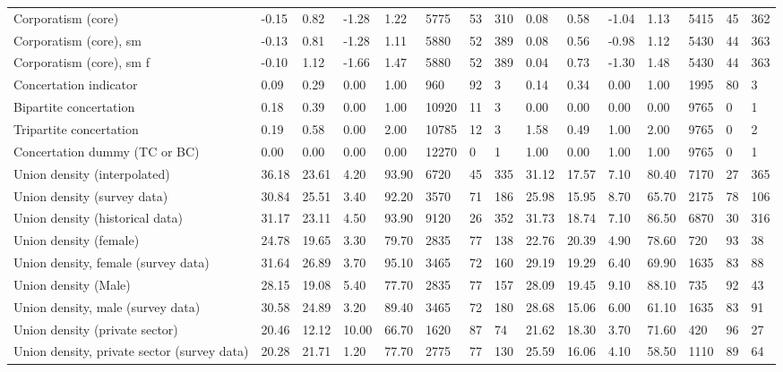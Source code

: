 \begin{longtable}{lllllllllllllll}
Corporatism (core) & -0.15 & 0.82 & -1.28 & 1.22 & 5775 & 53 & 310 & 0.08 & 0.58 & -1.04 & 1.13 & 5415 & 45 & 362\\
\addlinespace
Corporatism (core), sm & -0.13 & 0.81 & -1.28 & 1.11 & 5880 & 52 & 389 & 0.08 & 0.56 & -0.98 & 1.12 & 5430 & 44 & 363\\
Corporatism (core), sm f & -0.10 & 1.12 & -1.66 & 1.47 & 5880 & 52 & 389 & 0.04 & 0.73 & -1.30 & 1.48 & 5430 & 44 & 363\\
Concertation indicator & 0.09 & 0.29 & 0.00 & 1.00 & 960 & 92 & 3 & 0.14 & 0.34 & 0.00 & 1.00 & 1995 & 80 & 3\\
Bipartite concertation & 0.18 & 0.39 & 0.00 & 1.00 & 10920 & 11 & 3 & 0.00 & 0.00 & 0.00 & 0.00 & 9765 & 0 & 1\\
Tripartite concertation & 0.19 & 0.58 & 0.00 & 2.00 & 10785 & 12 & 3 & 1.58 & 0.49 & 1.00 & 2.00 & 9765 & 0 & 2\\
\addlinespace
Concertation dummy (TC or BC) & 0.00 & 0.00 & 0.00 & 0.00 & 12270 & 0 & 1 & 1.00 & 0.00 & 1.00 & 1.00 & 9765 & 0 & 1\\
Union density (interpolated) & 36.18 & 23.61 & 4.20 & 93.90 & 6720 & 45 & 335 & 31.12 & 17.57 & 7.10 & 80.40 & 7170 & 27 & 365\\
Union density (survey data) & 30.84 & 25.51 & 3.40 & 92.20 & 3570 & 71 & 186 & 25.98 & 15.95 & 8.70 & 65.70 & 2175 & 78 & 106\\
Union density (historical data) & 31.17 & 23.11 & 4.50 & 93.90 & 9120 & 26 & 352 & 31.73 & 18.74 & 7.10 & 86.50 & 6870 & 30 & 316\\
Union density (female) & 24.78 & 19.65 & 3.30 & 79.70 & 2835 & 77 & 138 & 22.76 & 20.39 & 4.90 & 78.60 & 720 & 93 & 38\\
\addlinespace
Union density, female (survey data) & 31.64 & 26.89 & 3.70 & 95.10 & 3465 & 72 & 160 & 29.19 & 19.29 & 6.40 & 69.90 & 1635 & 83 & 88\\
Union density (Male) & 28.15 & 19.08 & 5.40 & 77.70 & 2835 & 77 & 157 & 28.09 & 19.45 & 9.10 & 88.10 & 735 & 92 & 43\\
Union density, male (survey data) & 30.58 & 24.89 & 3.20 & 89.40 & 3465 & 72 & 180 & 28.68 & 15.06 & 6.00 & 61.10 & 1635 & 83 & 91\\
Union density (private sector) & 20.46 & 12.12 & 10.00 & 66.70 & 1620 & 87 & 74 & 21.62 & 18.30 & 3.70 & 71.60 & 420 & 96 & 27\\
Union density, private sector (survey data) & 20.28 & 21.71 & 1.20 & 77.70 & 2775 & 77 & 130 & 25.59 & 16.06 & 4.10 & 58.50 & 1110 & 89 & 64\\

\end{longtable}

